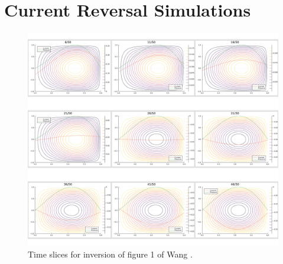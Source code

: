 
\chapter{Current Reversal Simulations}

\begin{figure}[h!]
    \centering
    \includegraphics*[scale=0.27]{imgs/c4/simulated-inversion-fig-1-whole-collage.png}
    \caption{Time slices for inversion of figure 1 of Wang \cite{wang-analytic-solution}.}
    \label{fig-1-inversion-whole}
\end{figure}


